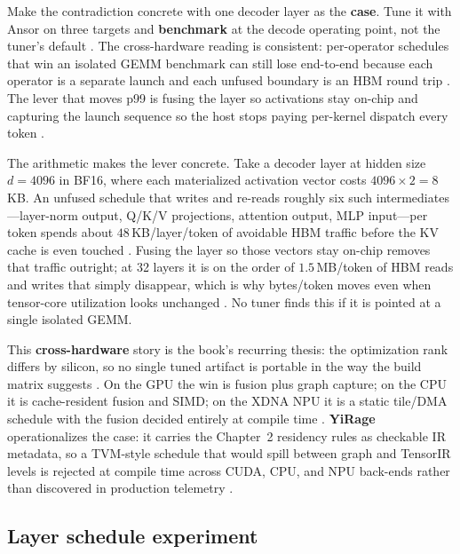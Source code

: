 Make the contradiction concrete with one decoder layer as the \textbf{case}. Tune it with Ansor on three targets and \textbf{benchmark} at the decode operating point, not the tuner's default \citep{zheng2020ansor,taxbreak2026}. The cross-hardware reading is consistent: per-operator schedules that win an isolated GEMM benchmark can still lose end-to-end because each operator is a separate launch and each unfused boundary is an HBM round trip \citep{memoryfloor2026,dao2022flashattention}. The lever that moves p99 is fusing the layer so activations stay on-chip and capturing the launch sequence so the host stops paying per-kernel dispatch every token \citep{nvidia2024cudagraphs,taxbreak2026}.

The arithmetic makes the lever concrete. Take a decoder layer at hidden size $d{=}4096$ in BF16, where each materialized activation vector costs $4096 \times 2 = 8\,$KB. An unfused schedule that writes and re-reads roughly six such intermediates---layer-norm output, Q/K/V projections, attention output, MLP input---per token spends about $48\,$KB/layer/token of avoidable HBM traffic before the KV cache is even touched \citep{memoryfloor2026,dao2022flashattention}. Fusing the layer so those vectors stay on-chip removes that traffic outright; at 32 layers it is on the order of $1.5\,$MB/token of HBM reads and writes that simply disappear, which is why bytes/token moves even when tensor-core utilization looks unchanged \citep{taxbreak2026}. No tuner finds this if it is pointed at a single isolated GEMM.

This \textbf{cross-hardware} story is the book's recurring thesis: the optimization rank differs by silicon, so no single tuned artifact is portable in the way the build matrix suggests \citep{patel2025llminference}. On the GPU the win is fusion plus graph capture; on the CPU it is cache-resident fusion and SIMD; on the XDNA NPU it is a static tile/DMA schedule with the fusion decided entirely at compile time \citep{amd2024xdna,amd2024aie}. \textbf{YiRage} operationalizes the case: it carries the Chapter~2 residency rules as checkable IR metadata, so a TVM-style schedule that would spill between graph and TensorIR levels is rejected at compile time across CUDA, CPU, and NPU back-ends rather than discovered in production telemetry \citep{yirage2026}.

\subsection{Layer schedule experiment}

